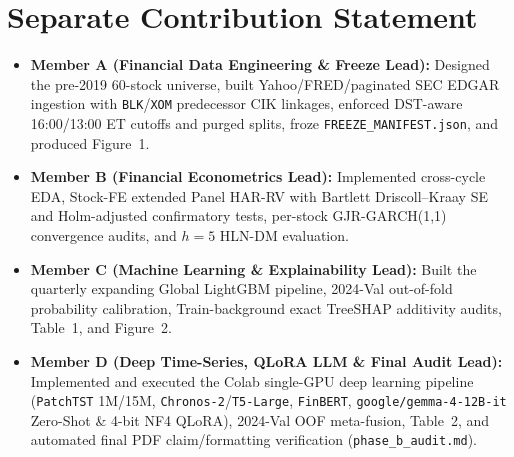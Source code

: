 \documentclass[11pt,a4paper]{article}
\begin{document}
\section*{Separate Contribution Statement}
\begin{itemize}\setlength{\itemsep}{2pt}
\item \textbf{Member A (Financial Data Engineering \& Freeze Lead):} Designed
the pre-2019 60-stock universe, built Yahoo/FRED/paginated SEC EDGAR ingestion
with \texttt{BLK}/\texttt{XOM} predecessor CIK linkages, enforced DST-aware
16:00/13:00 ET cutoffs and purged splits, froze \texttt{FREEZE\_MANIFEST.json},
and produced Figure~1.
\item \textbf{Member B (Financial Econometrics Lead):} Implemented cross-cycle
EDA, Stock-FE extended Panel HAR-RV with Bartlett Driscoll--Kraay SE and
Holm-adjusted confirmatory tests, per-stock GJR-GARCH(1,1) convergence audits,
and $h=5$ HLN-DM evaluation.
\item \textbf{Member C (Machine Learning \& Explainability Lead):} Built the
quarterly expanding Global LightGBM pipeline, 2024-Val out-of-fold probability
calibration, Train-background exact TreeSHAP additivity audits, Table~1, and
Figure~2.
\item \textbf{Member D (Deep Time-Series, QLoRA LLM \& Final Audit Lead):}
Implemented and executed the Colab single-GPU deep learning pipeline
(\texttt{PatchTST} 1M/15M, \texttt{Chronos-2}/\texttt{T5-Large},
\texttt{FinBERT}, \texttt{google/gemma-4-12B-it} Zero-Shot \& 4-bit NF4 QLoRA), 2024-Val
OOF meta-fusion, Table~2, and automated final PDF claim/formatting verification
(\texttt{phase\_b\_audit.md}).
\end{itemize}
\end{document}
